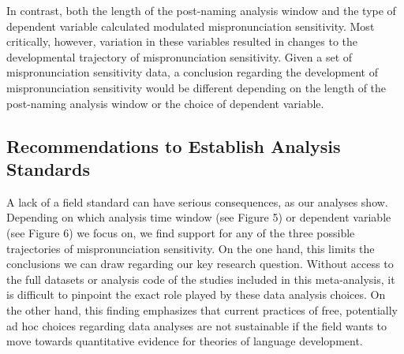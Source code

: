 \documentclass[man]{apa6}
\theoremstyle{definition}
\theoremstyle{definition}
\theoremstyle{definition}
\theoremstyle{remark}
\begin{document}
In contrast, both the length of the post-naming analysis window and the
type of dependent variable calculated modulated mispronunciation
sensitivity. Most critically, however, variation in these variables
resulted in changes to the developmental trajectory of mispronunciation
sensitivity. Given a set of mispronunciation sensitivity data, a
conclusion regarding the development of mispronunciation sensitivity
would be different depending on the length of the post-naming analysis
window or the choice of dependent variable.

\subsection{Recommendations to Establish Analysis
Standards}\label{recommendations-to-establish-analysis-standards}

A lack of a field standard can have serious consequences, as our
analyses show. Depending on which analysis time window (see Figure 5) or
dependent variable (see Figure 6) we focus on, we find support for any
of the three possible trajectories of mispronunciation sensitivity. On
the one hand, this limits the conclusions we can draw regarding our key
research question. Without access to the full datasets or analysis code
of the studies included in this meta-analysis, it is difficult to
pinpoint the exact role played by these data analysis choices. On the
other hand, this finding emphasizes that current practices of free,
potentially ad hoc choices regarding data analyses are not sustainable
if the field wants to move towards quantitative evidence for theories of
language development.
\end{document}
